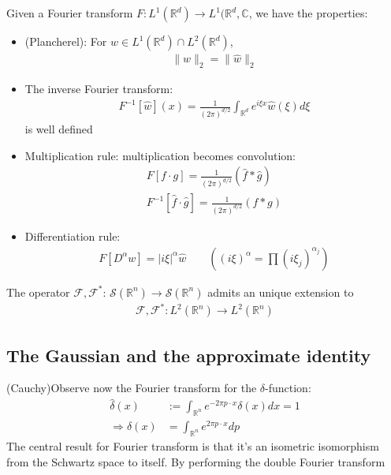 \begin{proposition}
Given a Fourier transform $F: L^1(\mathbb{R}^d) \rightarrow L^1(\mathbb{R}^d, \mathbb{C}$, we have the properties:
\begin{itemize}
	\item (Plancherel): For $w \in L^1(\mathbb{R}^d) \cap L^2(\mathbb{R}^d)$, 
	\begin{align*}
		\|w\|_2 = \|\hat{w}\|_2
	\end{align*}
	\item The inverse Fourier transform:
	\begin{align*}
		F^{-1}[\hat{w}](x) =\frac{1}{(2\pi)^{d/2}} \int_{\mathbb{R}^d}
		e^{i \xi x} \hat{w}(\xi) d\xi 
	\end{align*}
	is well defined
	\item Multiplication rule: multiplication becomes convolution:
	\begin{align*}
		F[f \cdot g] = \frac{1}{(2\pi)^{d/2}} (\hat{f}* \hat{g})\\
		F^{-1}[\hat{f} \cdot \hat{g}] = \frac{1}{(2\pi)^{d/2}} (f * g)
	\end{align*}
	\item Differentiation rule: 
	\begin{align*}
		F[D^\alpha w ] = |i \xi|^\alpha \hat{w} \qquad
		((i\xi)^\alpha = \prod (i \xi_j)^{\alpha_j})
	\end{align*}
\end{itemize}
\end{proposition}

\begin{corollary}
	The operator $\mathcal{F}, \mathcal{F}^*$: $\mathcal{S}(\mathbb{R}^n) \rightarrow \mathcal{S}(\mathbb{R}^n)$ admits an unique extension to 
	\begin{align*}
		\mathcal{F}, \mathcal{F}^*: L^2(\mathbb{R}^n) \rightarrow L^2(\mathbb{R}^n)
	\end{align*}
\end{corollary}

\subsection{The Gaussian and the approximate identity}
(Cauchy)Observe now the Fourier transform for the $\delta$-function:
\begin{align*}
	\hat{\delta}(x) &:= \int_{\mathbb{R}^n} e^{-2\pi p\cdot x}\delta(x)dx = 1\\
	\Rightarrow \delta(x) &= \int_{\mathbb{R}^n} e^{2 \pi p \cdot x} dp
\end{align*}
The central result for Fourier transform is that it's an isometric isomorphism from the Schwartz space to itself. By performing the double Fourier transform 

